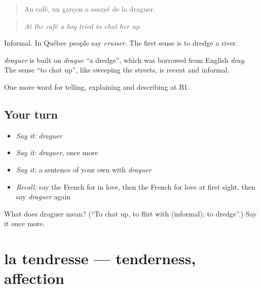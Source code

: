 \begin{quote}
Au café, un garçon a essayé de la draguer.
\end{quote}

\begin{quote}
\emph{At the café a boy tried to chat her up.}
\end{quote}

Informal. In Québec people say \emph{cruiser}. The first sense is to dredge a river.

\begin{cousinweb}
\emph{draguer} is built on \emph{drague} \textquotedblleft{}a dredge\textquotedblright{}, which was borrowed from English \emph{drag}. The sense \textquotedblleft{}to chat up\textquotedblright{}, like sweeping the streets, is recent and informal.
\end{cousinweb}

\begin{grammarlens}[title={What you've built}]
One more word for telling, explaining and describing at B1.
\end{grammarlens}

\subsection*{Your turn}
\begin{itemize}
\raggedright
  \item \emph{Say it:} \emph{draguer}
  \item \emph{Say it:} \emph{draguer}, once more
  \item \emph{Say it:} a sentence of your own with \emph{draguer}
  \item \emph{Recall:} say the French for in love, then the French for love at first sight, then say \emph{draguer} again
\end{itemize}

\begin{tcolorbox}[breakable,colback=teal!4,colframe=teal!35!black,title={Before you move on}]
What does draguer mean? (\textquotedblleft{}To chat up, to flirt with (informal); to dredge\textquotedblright{}.) Say it once more.
\end{tcolorbox}
\section[la tendresse]{la tendresse — tenderness, affection}

\label{lesson:FR-C487-tendresse}




